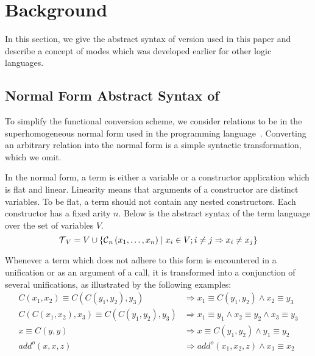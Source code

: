 \section{Background}

In this section, we give the abstract syntax of \micro version used in this paper and describe a concept of modes which was developed earlier for other logic languages.

\subsection{Normal Form Abstract Syntax of \micro}

To simplify the functional conversion scheme, we consider \micro relations to be in the superhomogeneous normal form used in the \merc programming language~\cite{somogyi1996execution}.
Converting an arbitrary \micro relation into the normal form is a simple syntactic transformation, which we omit.

In the normal form, a term is either a variable or a constructor application which is flat and linear.
Linearity means that arguments of a constructor are distinct variables.
To be flat, a term should not contain any nested constructors.
Each constructor has a fixed arity $n$.
Below is the abstract syntax of the term language over the set of variables $V$.
\[  \operatorname{\mathcal{T}}_{V} = V \cup \{\operatorname{\mathcal{C}}_{n}\left( x_1, \ldots, x_{n} \right) \mid x_{i}\in V; i \neq j \Rightarrow x_i \neq x_j\} \]

Whenever a term which does not adhere to this form is encountered in a unification or as an argument of a call, it is transformed into a conjunction of several unifications, as illustrated by the following examples:
\begin{equation*}
\begin{split}
C\left( x_1, x_2 \right) \equiv C\left( C\left( y_1, y_2 \right), y_3 \right) & \Rightarrow x_1 \equiv C\left( y_1, y_2 \right) \land x_2 \equiv y_3 \\
C\left( C\left( x_1, x_2 \right), x_3 \right) \equiv C\left( C\left( y_1, y_2 \right), y_3 \right) & \Rightarrow  x_1 \equiv y_1 \land x_2 \equiv y_2 \land x_3 \equiv y_3 \\
x \equiv C \left(y, y \right) & \Rightarrow x \equiv C \left(y_1, y_2\right) \land y_1 \equiv y_2 \\
add^o\left( x, x, z \right) & \Rightarrow add^o\left( x_1, x_2, z \right) \land x_1 \equiv x_2
\end{split}
\end{equation*}

